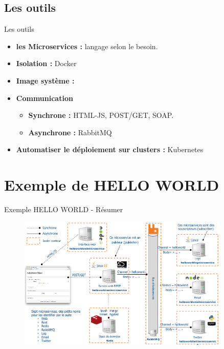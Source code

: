 \documentclass{beamer}
\begin{document}
\subsection{Les outils}
\begin{frame}{Les outils}
    \begin{itemize}
        \item \textbf{les Microservices : } langage selon le besoin.
        \item \textbf{Isolation :} Docker
        \item \textbf{Image système : } \href{https://hub.docker.com/}{}
        \item \textbf{Communication } 
            \begin{itemize}
                \item \textbf{Synchrone : } HTML-JS, POST/GET, SOAP.
                \item \textbf{Asynchrone : } RabbitMQ
            \end{itemize}
        \item \textbf{Automatiser le déploiement sur clusters :} Kubernetes 
    \end{itemize}
\end{frame}
\section{Exemple de HELLO WORLD}
\begin{frame}{Exemple HELLO WORLD - Résumer }   
         \begin{figure}
            \begin{center}
                \includegraphics[width=0.9\textwidth]{hello.png}
            \end{center}
        \end{figure}
\end{frame}
\end{document}
